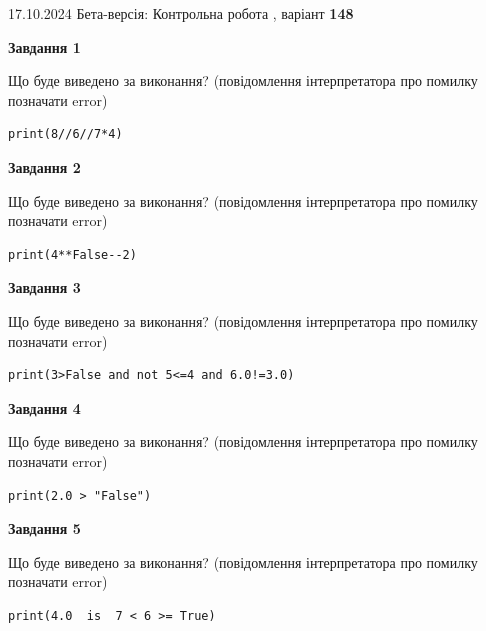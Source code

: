 \documentclass[12pt, ukrainian]{article}
\begin{document}
{\Large{17.10.2024 Бета-версія: Контрольна робота , варіант  \No \textbf { 148 }\par}}
{
\begin {large}
{\begin {center}\textbf{Завдання 1}\end {center}}

Що буде виведено за виконання? (повідомлення інтерпретатора про помилку позначати error)\par
\begin{verbatim}
print(8//6//7*4)
\end{verbatim}

{\begin {center}\textbf{Завдання 2}\end {center}}

Що буде виведено за виконання? (повідомлення інтерпретатора про помилку позначати error)\par
\begin{verbatim}
print(4**False--2)
\end{verbatim}

{\begin {center}\textbf{Завдання 3}\end {center}}

Що буде виведено за виконання? (повідомлення інтерпретатора про помилку позначати error)\par
\begin{verbatim}
print(3>False and not 5<=4 and 6.0!=3.0)
\end{verbatim}

{\begin {center}\textbf{Завдання 4}\end {center}}

Що буде виведено за виконання? (повідомлення інтерпретатора про помилку позначати error)\par
\begin{verbatim}
print(2.0 > "False")
\end{verbatim}

{\begin {center}\textbf{Завдання 5}\end {center}}

Що буде виведено за виконання? (повідомлення інтерпретатора про помилку позначати error)\par
\begin{verbatim}
print(4.0  is  7 < 6 >= True)
\end{verbatim}


\end{large}}
\end{document}
